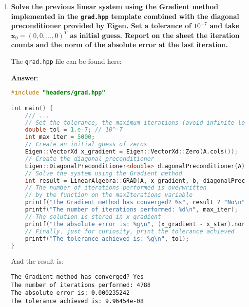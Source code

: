 \begin{enumerate}[label=\textcolor{Green3}{\textbf{\arabic*.}}]
    \newpage


    \item \textcolor{Green3}{\textbf{%
        Solve the previous linear system using the Gradient method implemented in the \texttt{grad.hpp} template combined with the diagonal preconditioner provided by Eigen. Set a tolerance of $10^{-7}$ and take $\mathbf{x}_{0} = \left(0,0,\dots,0\right)^{T}$ as initial guess. Report on the sheet the iteration counts and the norm of the absolute error at the last iteration.
    }}

    The \texttt{grad.hpp} file can be found here:
    \begin{center}
    \end{center}

    \textbf{Answer}:
    \begin{lstlisting}[language=C++]
#include "headers/grad.hpp"

int main() {
    /// ...
    // Set the tolerance, the maximum iterations (avoid infinite loop)
    double tol = 1.e-7; // 10^-7
    int max_iter = 5000;
    // Create an initial guess of zeros
    Eigen::VectorXd x_gradient = Eigen::VectorXd::Zero(A.cols());
    // Create the diagonal preconditioner
    Eigen::DiagonalPreconditioner<double> diagonalPreconditioner(A);
    // Solve the system using the Gradient method
    int result = LinearAlgebra::GRAD(A, x_gradient, b, diagonalPreconditioner, max_iter, tol);
    // The number of iterations performed is overwritten
    // by the function on the maxIterations variable
    printf("The Gradient method has converged? %s", result ? "No\n" : "Yes\n");
    printf("The number of iterations performed: %d\n", max_iter);
    // The solution is stored in x_gradient
    printf("The absolute error is: %g\n", (x_gradient - x_star).norm());
    // Finally, just for curiosity, print the tolerance achieved
    printf("The tolerance achieved is: %g\n", tol);
}\end{lstlisting}
    And the result is:
    \begin{lstlisting}
The Gradient method has converged? Yes
The number of iterations performed: 4788
The absolute error is: 0.000235242
The tolerance achieved is: 9.96454e-08\end{lstlisting}


    \newpage


\end{enumerate}
